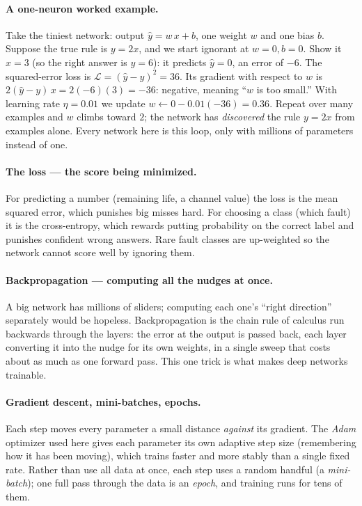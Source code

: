 \paragraph{A one-neuron worked example.} Take the tiniest network: output
$\hat{y} = w\,x + b$, one weight $w$ and one bias $b$. Suppose the true rule is $y = 2x$, and
we start ignorant at $w=0, b=0$. Show it $x=3$ (so the right answer is $y=6$): it predicts
$\hat{y}=0$, an error of $-6$. The squared-error loss is $\mathcal{L}=(\hat{y}-y)^2=36$. Its
gradient with respect to $w$ is $2(\hat{y}-y)\,x = 2(-6)(3) = -36$: negative, meaning ``$w$ is
too small.'' With learning rate $\eta=0.01$ we update $w \leftarrow 0 - 0.01(-36) = 0.36$.
Repeat over many examples and $w$ climbs toward $2$; the network has \emph{discovered}
the rule $y=2x$ from examples alone. Every network here is this loop, only with millions of
parameters instead of one.

\paragraph{The loss --- the score being minimized.} For predicting a number (remaining life,
a channel value) the loss is the mean squared error, which punishes big misses hard. For
choosing a class (which fault) it is the cross-entropy, which rewards putting probability on
the correct label and punishes confident wrong answers. Rare fault classes are up-weighted so
the network cannot score well by ignoring them.

\paragraph{Backpropagation --- computing all the nudges at once.} A big network has millions
of sliders; computing each one's ``right direction'' separately would be hopeless.
Backpropagation is the chain rule of calculus run backwards through the layers: the error at
the output is passed back, each layer converting it into the nudge for its own weights, in a
single sweep that costs about as much as one forward pass. This one trick is what makes deep
networks trainable.

\paragraph{Gradient descent, mini-batches, epochs.} Each step moves every parameter a small
distance \emph{against} its gradient. The \emph{Adam} optimizer used here gives each parameter
its own adaptive step size (remembering how it has been moving), which trains faster and more
stably than a single fixed rate. Rather than use all data at once, each step uses a random
handful (a \emph{mini-batch}); one full pass through the data is an \emph{epoch}, and training
runs for tens of them.

